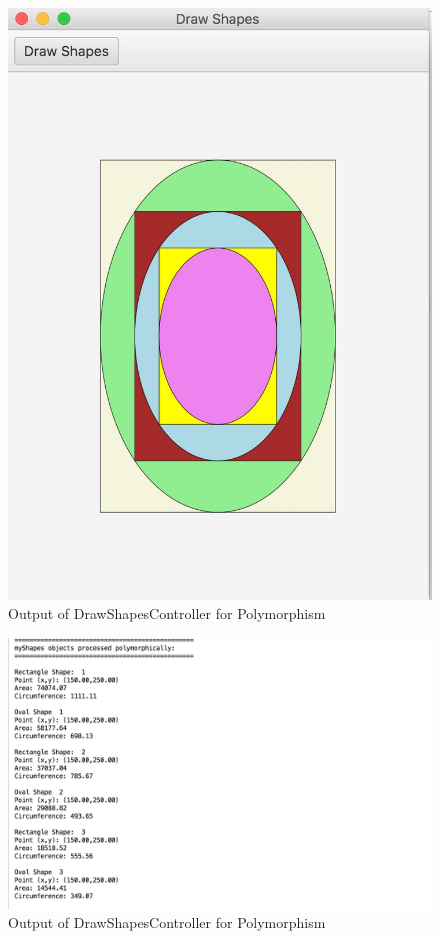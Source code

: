 \documentclass[a4paper,12pt]{article}
\begin{document}
\begin{figure}[H]
   \centering
   \includegraphics[width = 17cm]{geometric_configuration2} %
   \caption{Output of DrawShapesController for Polymorphism}
   \label{Output_of_DrawShapesController for Polymorphism2}
\end{figure}


\begin{figure}[H]
   \centering
   \includegraphics[width = 17cm]{geometric_configuration_written2} %
   \caption{Output of DrawShapesController for Polymorphism}
   \label{Output of DrawShapesController for Polymorphism_written2}
\end{figure}
\end{document}
